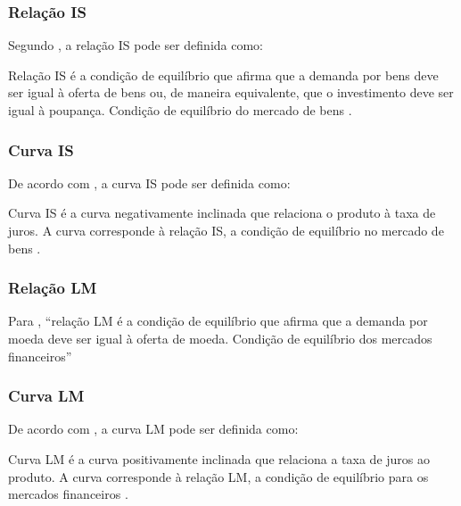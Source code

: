 \documentclass[
	10pt,				%
	openright,			%
	twoside,			%
	a5paper,			%
	english,			%
	french,				%
	spanish,			%
	brazil				%
	]{abntex2}
\renewenvironment{quote}
  {\small\list{}{\rightmargin=0.1cm \leftmargin=4cm}%
   \item\relax}
  {\endlist}
\begin{document}
\subsubsection{Relação IS}\label{relauxe7uxe3o-is}

Segundo , a relação IS pode ser definida
como:

\begin{quote}
Relação IS é a condição de equilíbrio que afirma que a demanda por bens
deve ser igual à oferta de bens ou, de maneira equivalente, que o
investimento deve ser igual à poupança. Condição de equilíbrio do
mercado de bens \cite[p.~582]{blanchard}.
\end{quote}

\subsubsection{Curva IS}\label{curva-is}

De acordo com , a curva IS pode ser definida
como:

\begin{quote}
Curva IS é a curva negativamente inclinada que relaciona o produto à
taxa de juros. A curva corresponde à relação IS, a condição de
equilíbrio no mercado de bens \cite[p.~575]{blanchard}.
\end{quote}

\subsubsection{Relação LM}\label{relauxe7uxe3o-lm}

Para , ``relação LM é a condição de
equilíbrio que afirma que a demanda por moeda deve ser igual à oferta de
moeda. Condição de equilíbrio dos mercados financeiros''
\cite[p.~582]{blanchard}

\subsubsection{Curva LM}\label{curva-lm}

De acordo com , a curva LM pode ser definida
como:

\begin{quote}
Curva LM é a curva positivamente inclinada que relaciona a taxa de juros
ao produto. A curva corresponde à relação LM, a condição de equilíbrio
para os mercados financeiros \cite[p.~575]{blanchard}.
\end{quote}
\end{document}
